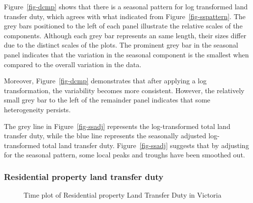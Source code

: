 \documentclass[
  11pt,
  a4paper,
]{article}
\begin{document}
Figure~\ref{fig-dcmp} shows that there is a seasonal pattern for log
transformed land transfer duty, which agrees with what indicated from
Figure~\ref{fig-sspattern}. The grey bars positioned to the left of each
panel illustrate the relative scales of the components. Although each
grey bar represents an same length, their sizes differ due to the
distinct scales of the plots. The prominent grey bar in the seasonal
panel indicates that the variation in the seasonal component is the
smallest when compared to the overall variation in the data.

Moreover, Figure~\ref{fig-dcmp} demonstrates that after applying a log
transformation, the variability becomes more consistent. However, the
relatively small grey bar to the left of the remainder panel indicates
that some heterogeneity persists.

The grey line in Figure~\ref{fig-ssadj} represents the log-transformed
total land transfer duty, while the blue line represents the seasonally
adjusted log-transformed total land transfer duty.
Figure~\ref{fig-ssadj} suggests that by adjusting for the seasonal
pattern, some local peaks and troughs have been smoothed out.

\subsubsection{Residential property land transfer
duty}\label{residential-property-land-transfer-duty}

\begin{figure}


\caption{\label{fig-restrend}Time plot of Residential property Land
Transfer Duty in Victoria}

\end{figure}%
\end{document}
